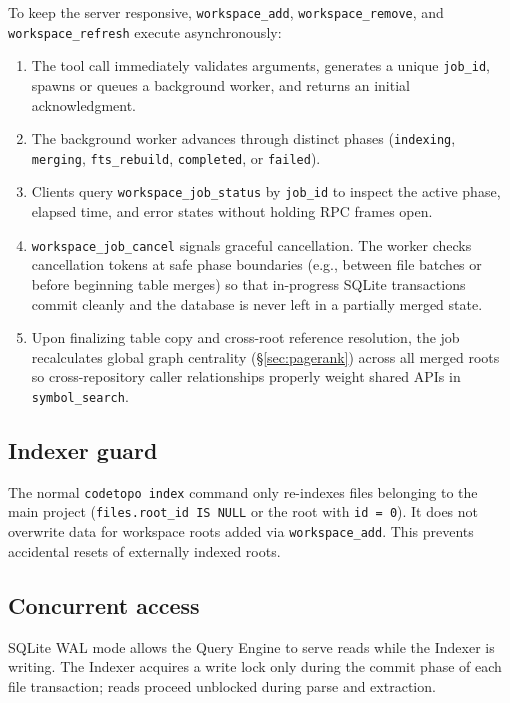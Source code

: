 To keep the server responsive, \texttt{workspace\_add}, \texttt{workspace\_remove},
and \texttt{workspace\_refresh} execute asynchronously:
\begin{enumerate}
  \item The tool call immediately validates arguments, generates a unique
        \texttt{job\_id}, spawns or queues a background worker, and returns
        an initial acknowledgment.
  \item The background worker advances through distinct phases (\texttt{indexing},
        \texttt{merging}, \texttt{fts\_rebuild}, \texttt{completed}, or
        \texttt{failed}).
  \item Clients query \texttt{workspace\_job\_status} by \texttt{job\_id} to
        inspect the active phase, elapsed time, and error states without
        holding RPC frames open.
  \item \texttt{workspace\_job\_cancel} signals graceful cancellation. The
        worker checks cancellation tokens at safe phase boundaries (e.g.,
        between file batches or before beginning table merges) so that
        in-progress SQLite transactions commit cleanly and the database is
        never left in a partially merged state.
  \item Upon finalizing table copy and cross-root reference resolution, the
        job recalculates global graph centrality (\S\ref{sec:pagerank})
        across all merged roots so cross-repository caller relationships
        properly weight shared APIs in \texttt{symbol\_search}.
\end{enumerate}

\subsection{Indexer guard}

The normal \texttt{codetopo index} command only re-indexes files belonging to
the main project (\texttt{files.root\_id IS NULL} or the root with
\texttt{id = 0}). It does not overwrite data for workspace roots added via
\texttt{workspace\_add}. This prevents accidental resets of externally indexed
roots.

\subsection{Concurrent access}

SQLite WAL mode allows the Query Engine to serve reads while the Indexer is
writing. The Indexer acquires a write lock only during the commit phase of each
file transaction; reads proceed unblocked during parse and extraction.

